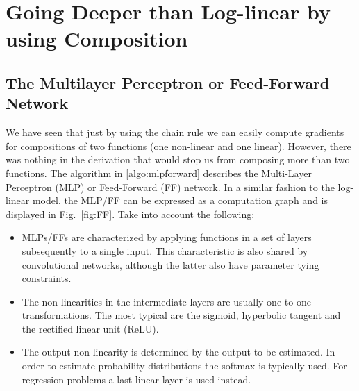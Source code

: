 \section{Going Deeper than Log-linear by using Composition}
\label{sec:deep_forward}

\subsection{The Multilayer Perceptron or Feed-Forward Network}

We have seen that just by using the chain rule we can easily compute gradients for
compositions of two functions (one non-linear and one linear). However, there
was nothing in the derivation that would stop us from composing more than two
functions. The algorithm in \ref{algo:mlpforward} describes the Multi-Layer Perceptron (MLP) or Feed-Forward (FF) network. In a similar fashion to the log-linear model, the MLP/FF can be expressed as a computation graph and is displayed in Fig.~\ref{fig:FF}. Take into account the following:

%
\begin{itemize}
\item MLPs/FFs are characterized by applying functions in a set of layers subsequently to a single input. This characteristic is also shared by convolutional networks, although the latter also have parameter tying constraints.
\item The non-linearities in the intermediate layers are usually one-to-one transformations. The most typical are the sigmoid, hyperbolic tangent and the rectified linear unit (ReLU).
\item The output non-linearity is determined by the output to be estimated. In order to estimate probability distributions the softmax is typically used. For regression problems a last linear layer is used instead.
\end{itemize}



